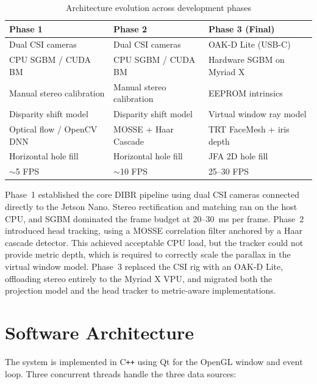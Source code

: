 \documentclass[11pt, a4paper]{report}
\begin{document}
\begin{table}[h]
\centering
\caption{Architecture evolution across development phases}
\label{tab:arch_evolution}
\begin{tabular}{@{}p{3.5cm}p{3.5cm}p{3.5cm}@{}}
\toprule
\textbf{Phase 1} & \textbf{Phase 2} & \textbf{Phase 3 (Final)} \\
\midrule
Dual CSI cameras & Dual CSI cameras & OAK-D Lite (USB-C) \\
CPU SGBM / CUDA BM & CPU SGBM / CUDA BM & Hardware SGBM on Myriad X \\
Manual stereo calibration & Manual stereo calibration & EEPROM intrinsics \\
Disparity shift model & Disparity shift model & Virtual window ray model \\
Optical flow / OpenCV DNN & MOSSE + Haar Cascade & TRT FaceMesh + iris depth \\
Horizontal hole fill & Horizontal hole fill & JFA 2D hole fill \\
$\sim$5 FPS & $\sim$10 FPS & 25--30 FPS \\
\bottomrule
\end{tabular}
\end{table}

Phase~1 established the core DIBR pipeline using dual CSI cameras
connected directly to the Jetson Nano.
Stereo rectification and matching ran on the host CPU, and SGBM dominated
the frame budget at 20--30~ms per frame.
Phase~2 introduced head tracking, using a MOSSE correlation filter
anchored by a Haar cascade detector.
This achieved acceptable CPU load, but the tracker could not provide
metric depth, which is required to correctly scale the parallax in the
virtual window model.
Phase~3 replaced the CSI rig with an OAK-D Lite, offloading stereo
entirely to the Myriad X VPU, and migrated both the projection model
and the head tracker to metric-aware implementations.

\section{Software Architecture}
\label{sec:software_arch}

The system is implemented in C\texttt{++} using Qt for the OpenGL window
and event loop.
Three concurrent threads handle the three data sources:
\end{document}
